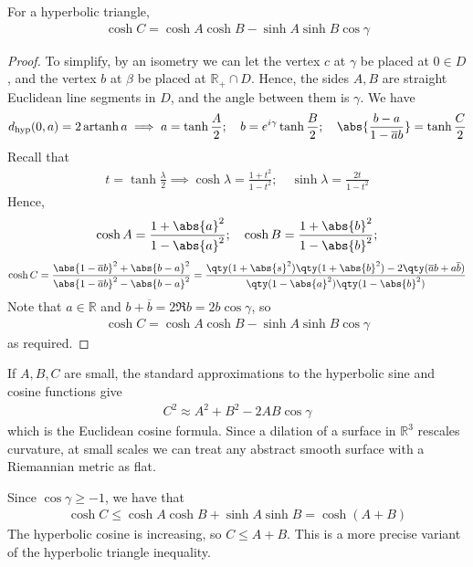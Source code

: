\begin{proposition}
	For a hyperbolic triangle,
	\begin{align*}
		\cosh C = \cosh A \cosh B - \sinh A \sinh B \cos \gamma
	\end{align*}
\end{proposition}
\begin{proof}
	To simplify, by an isometry we can let the vertex $c$ at $\gamma$ be placed at $0 \in D$, and the vertex $b$ at $\beta$ be placed at $\mathbb R_+ \cap D$.
	Hence, the sides $A, B$ are straight Euclidean line segments in $D$, and the angle between them is $\gamma$.
	We have
	\begin{align*}
		d_{\text{hyp}}(0,a) = 2 \artanh a \implies a = \tanh \frac{A}{2};\quad b = e^{i\gamma} \tanh \frac{B}{2};\quad \abs{\frac{b-a}{1-\overline a b}} = \tanh \frac{C}{2}
	\end{align*}
	Recall that
	\begin{align*}
		t = \tanh \frac{\lambda}{2} \implies \cosh \lambda = \frac{1+t^2}{1-t^2};\quad \sinh \lambda = \frac{2t}{1-t^2}
	\end{align*}
	Hence,
	\begin{align*}
		\cosh A = \frac{1 + \abs{a}^2}{1 - \abs{a}^2};\quad \cosh B = \frac{1 + \abs{b}^2}{1 - \abs{b}^2};
	\end{align*}
	\begin{align*}
		\cosh C = \frac{\abs{1-\overline a b}^2 + \abs{b-a}^2}{\abs{1-\overline a b}^2 - \abs{b-a}^2} = \frac{\qty(1+\abs{s}^2)\qty(1+\abs{b}^2) - 2\qty(\overline a b + a \overline b)}{\qty(1 - \abs{a}^2)\qty(1 - \abs{b}^2)}
	\end{align*}
	Note that $a \in \mathbb R$ and $b + \overline b = 2 \Re b = 2b \cos \gamma$, so
	\begin{align*}
		\cosh C = \cosh A \cosh B - \sinh A \sinh B \cos \gamma
	\end{align*}
	as required.
\end{proof}
\begin{remark}
	If $A, B, C$ are small, the standard approximations to the hyperbolic sine and cosine functions give
	\begin{align*}
		C^2 \approx A^2 + B^2 - 2AB \cos \gamma
	\end{align*}
	which is the Euclidean cosine formula.
	Since a dilation of a surface in $\mathbb R^3$ rescales curvature, at small scales we can treat any abstract smooth surface with a Riemannian metric as flat.

	Since $\cos \gamma \geq -1$, we have that
	\begin{align*}
		\cosh C \leq \cosh A \cosh B + \sinh A \sinh B = \cosh(A+B)
	\end{align*}
	The hyperbolic cosine is increasing, so $C \leq A + B$.
	This is a more precise variant of the hyperbolic triangle inequality.
\end{remark}

